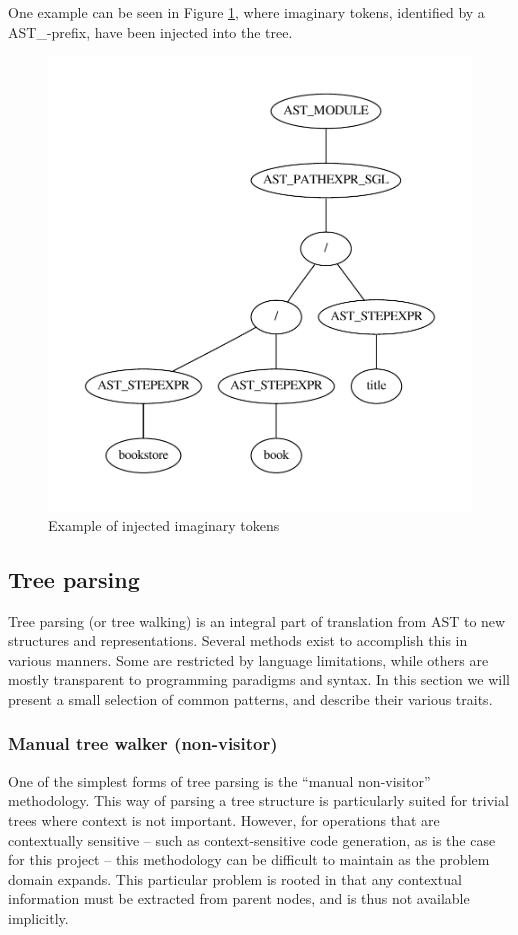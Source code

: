 One example can be seen in Figure \ref{figure:parser:imaginary_tokens_path},
where imaginary tokens, identified by a AST\_-prefix, have been injected into the tree.

\begin{figure}[!h]
  \centering
    \includegraphics[scale=0.45]{img/graphs/path1} 
  \caption{Example of injected imaginary tokens}
  \label{figure:parser:imaginary_tokens_path}
\end{figure}

\subsection{Tree parsing}
\label{sect:theory:parser:tree_parsing}
Tree parsing (or tree walking) is an integral part of translation from AST to
new structures and representations. Several methods exist to accomplish this in
various manners. Some are restricted by language limitations, while others are
mostly transparent to programming paradigms and syntax. In this section we will
present a small selection of common patterns, and describe their various traits.

\subsubsection{Manual tree walker (non-visitor)}
\label{sect:theory:manual_walker}
One of the simplest forms of tree parsing is the ``manual non-visitor''
methodology. This way of parsing a tree structure is particularly suited for
trivial trees where context is not important. However, for operations that are
contextually sensitive -- such as context-sensitive code generation, as is the
case for this project -- this methodology can be difficult to maintain as the
problem domain expands. This particular problem is rooted in that any
contextual information must be extracted from parent nodes, and is thus not
available implicitly.

